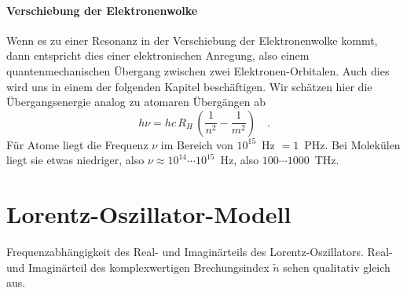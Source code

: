 \paragraph{Verschiebung der Elektronenwolke} Wenn es zu einer Resonanz in der Verschiebung der Elektronenwolke kommt, dann entspricht dies einer elektronischen Anregung, also einem quantenmechanischen Übergang zwischen zwei Elektronen-Orbitalen. Auch dies wird uns in einem der folgenden Kapitel beschäftigen. Wir schätzen hier die Übergangsenergie analog zu atomaren Übergängen ab
\begin{equation}
  h \nu = hc \, R_H \, \left( \frac{1}{n^2} - \frac{1}{m^2} \right) \quad .
\end{equation}
Für Atome liegt die Frequenz $\nu$ im Bereich von $10^{15}$~Hz $= 1$~PHz. Bei Molekülen liegt sie etwas niedriger, also $\nu \approx 10^{14} \cdots 10^{15}$~Hz, also $100 \cdots 1000$~THz.


\section{Lorentz-Oszillator-Modell}


\begin{marginfigure}

\caption{Frequenzabhängigkeit des Real- und Imaginärteils des Lorentz-Oszillators. Real- und  Imaginärteil des komplexwertigen Brechungsindex $\tilde{n}$ sehen qualitativ gleich aus. \label{fig:diel_lorentz}}
\end{marginfigure}

